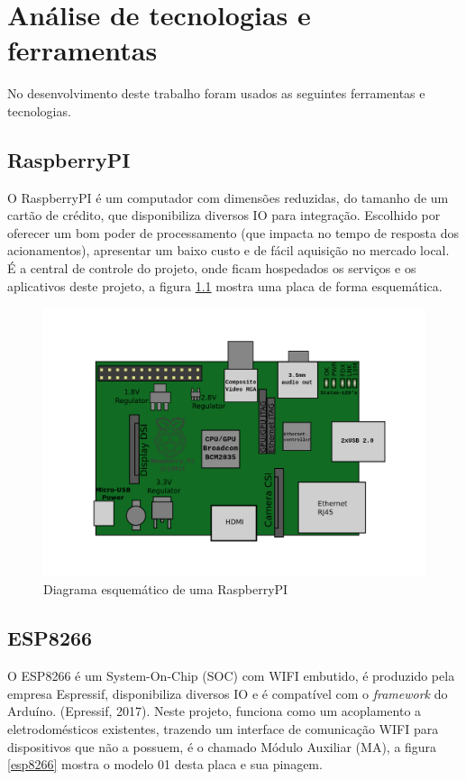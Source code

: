 \chapter{Análise de tecnologias e ferramentas}
No desenvolvimento deste trabalho foram usados as seguintes ferramentas e tecnologias.

\section{RaspberryPI}
O RaspberryPI é um computador com dimensões reduzidas, do tamanho de um cartão de crédito, que disponibiliza diversos IO para integração. Escolhido por oferecer um bom poder de processamento (que impacta no tempo de resposta dos acionamentos), apresentar um baixo custo e de fácil aquisição no mercado local. É a central de controle do projeto, onde ficam hospedados os serviços e os aplicativos deste projeto, a figura \ref{raspberryPI} mostra uma placa de forma esquemática. \cite{RaspberryPI2017}

\begin{figure}[H]
\caption{\label{raspberryPI}Diagrama esquemático de uma RaspberryPI}
\includegraphics[scale=0.15]{img/raspberrypi.png}
\end{figure}

\section{ESP8266}
O ESP8266 é um System-On-Chip (SOC) com WIFI embutido, é produzido pela empresa Espressif, disponibiliza diversos IO e é compatível com o \textit{framework} do Arduíno. (Epressif, 2017). Neste projeto, funciona como um acoplamento a eletrodomésticos existentes, trazendo um interface de comunicação WIFI para dispositivos que não a possuem, é o chamado Módulo Auxiliar (MA), a figura \ref{esp8266} mostra o modelo 01 desta placa e sua pinagem. \cite{Esp82662017}

